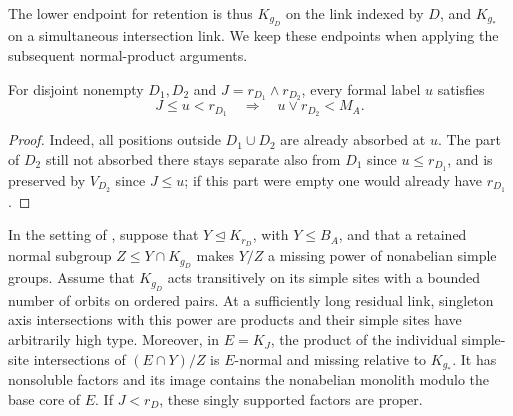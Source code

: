 The lower endpoint for retention is thus \(K_{g_D}\) on the link
indexed by \(D\), and \(K_{g_*}\) on a simultaneous intersection link.
We keep these endpoints when applying the subsequent normal-product
arguments.

\begin{lemma}\label{fa:disjoint-join}
For disjoint nonempty \(D_1,D_2\) and \(J=r_{D_1}\wedge r_{D_2}\), every formal label \(u\) satisfies
\begin{equation}\label{fa:join-restriction}
 J\le u<r_{D_1}\quad\Longrightarrow\quad u\vee r_{D_2}<M_A.
\end{equation}
\end{lemma}

\begin{proof}

Indeed, all positions outside \(D_1\cup D_2\) are already absorbed at \(u\). The part of \(D_2\) still
not absorbed there stays separate also from \(D_1\) since \(u\le r_{D_1}\), and is preserved by
\(V_{D_2}\) since \(J\le u\); if this part were empty one would already have \(r_{D_1}\).

\end{proof}

\begin{lemma}\label{fa:intersection-support}
In the setting of , suppose that \(Y\trianglelefteq K_{r_D}\), with \(Y\le B_A\), and
that a retained normal subgroup \(Z\le Y\cap K_{g_D}\) makes \(Y/Z\) a missing power of nonabelian simple
groups.  Assume that \(K_{g_D}\) acts transitively on its simple sites with a bounded number of orbits on
ordered pairs.  At a sufficiently long residual link, singleton axis intersections with this power are
products and their simple sites have arbitrarily high type.  Moreover, in \(E=K_J\), the product of the
individual simple-site intersections of \((E\cap Y)/Z\) is \(E\)-normal and missing relative to
\(K_{g_*}\).  It has nonsoluble factors and its image contains the nonabelian monolith modulo the base
core of \(E\).  If \(J<r_D\), these singly supported factors are proper.
\end{lemma}

